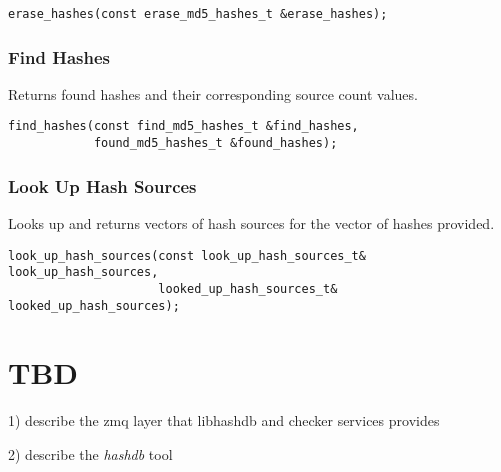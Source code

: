 \documentclass[12pt,twoside]{article}
\newcommand{\hdb}{\emph{hashdb}\xspace}
\begin{document}
\begin{small}
\begin{verbatim}
erase_hashes(const erase_md5_hashes_t &erase_hashes);
\end{verbatim}
\end{small}

\subsubsection{Find Hashes}
Returns found hashes and their corresponding source count values.

\begin{small}
\begin{verbatim}
find_hashes(const find_md5_hashes_t &find_hashes,
            found_md5_hashes_t &found_hashes);
\end{verbatim}
\end{small}

\subsubsection{Look Up Hash Sources}
Looks up and returns vectors of hash sources for the vector of hashes provided.

\begin{small}
\begin{verbatim}
look_up_hash_sources(const look_up_hash_sources_t& look_up_hash_sources,
                     looked_up_hash_sources_t& looked_up_hash_sources);
\end{verbatim}
\end{small}



















\section{TBD}
1) describe the zmq layer that libhashdb and checker services provides

2) describe the \hdb tool
\end{document}
